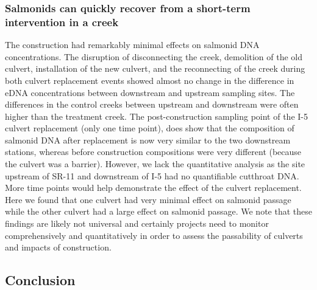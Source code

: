 \documentclass[
]{article}
\begin{document}
\hypertarget{salmonids-can-quickly-recover-from-a-short-term-intervention-in-a-creek}{%
\subsubsection{Salmonids can quickly recover from a short-term
intervention in a
creek}\label{salmonids-can-quickly-recover-from-a-short-term-intervention-in-a-creek}}

The construction had remarkably minimal effects on salmonid DNA
concentrations. The disruption of disconnecting the creek, demolition of
the old culvert, installation of the new culvert, and the reconnecting
of the creek during both culvert replacement events showed almost no
change in the difference in eDNA concentrations between downstream and
upstream sampling sites. The differences in the control creeks between
upstream and downstream were often higher than the treatment creek. The
post-construction sampling point of the I-5 culvert replacement (only
one time point), does show that the composition of salmonid DNA after
replacement is now very similar to the two downstream stations, whereas
before construction compositions were very different (because the
culvert was a barrier). However, we lack the quantitative analysis as
the site upstream of SR-11 and downstream of I-5 had no quantifiable
cutthroat DNA. More time points would help demonstrate the effect of the
culvert replacement. Here we found that one culvert had very minimal
effect on salmonid passage while the other culvert had a large effect on
salmonid passage. We note that these findings are likely not universal
and certainly projects need to monitor comprehensively and
quantitatively in order to assess the passability of culverts and
impacts of construction.

\hypertarget{conclusion}{%
\subsection{Conclusion}\label{conclusion}}
\end{document}
